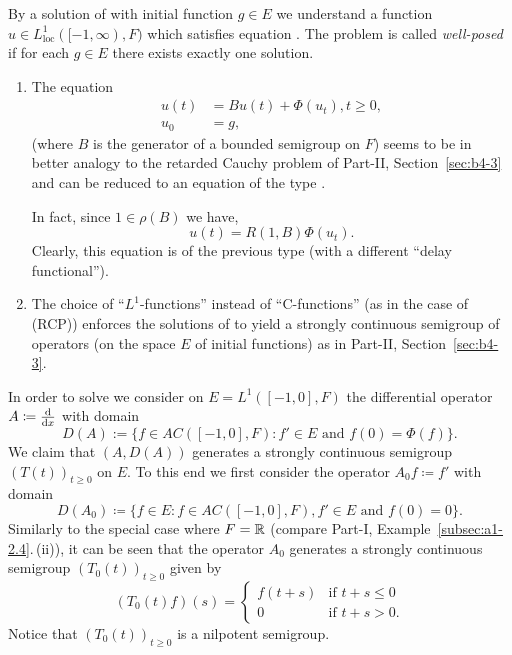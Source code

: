 By a solution of  with initial function $g \in E$ we understand a function $u \in L^{1}_{\mathrm{loc}}([-1,\infty),F)$ which satisfies equation .
The problem  is called \emph{well-posed} if for each $g \in E$ there exists exactly one solution.
\begin{remarks*}
\begin{enumerate}[\upshape (i), wide, labelindent=.25em] 
\item \label{rem:c4-kgk-1}
The equation
\begin{align*}
u(t) &= Bu(t) + \Phi(u_t), t \geq 0,\\
u_0 &= g,
\end{align*}
(where $B$ is the generator of a bounded semigroup on $F$) seems to be in better analogy to the retarded Cauchy problem of Part-II, Section~\ref{sec:b4-3} and can be reduced to an equation of the type .

In fact, since $1 \in \rho(B)$ we have,
\begin{equation*}\label{eq:c4-3.0-KGK1}
u(t) = R(1,B)\Phi(u_{t}).
\end{equation*}
Clearly, this equation is of the previous type (with a different \enquote{delay functional}).
\item \label{rem:c4-kgk-2}
The choice of \enquote{$L^{1}$-functions} instead of \enquote{C-functions} (as in the case of (RCP)) enforces the solutions of  to yield a strongly continuous semigroup of operators (on the space $E$ of initial functions) as in Part-II, Section~\ref{sec:b4-3}.
\end{enumerate}
\end{remarks*}
In order to solve  we consider on $E = L^{1}([-1,0],F)$ the differential operator $A \coloneq  \frac{\mathop{}\!\mathrm{d}{}}{\mathop{}\!\mathrm{d}{x}}$ with domain
\begin{equation*}\label{eq:c4-3.0-KGK2}
D(A):=\{f \in AC([-1,0],F) \colon f' \in E \text{ and } f(0) = \Phi(f)\}.
\end{equation*}
We claim that $(A,D(A))$ generates a strongly continuous semigroup $(T(t))_{t\geq 0}$ on $E$.
To this end we first consider the operator $A_0 f \coloneqq f'$ with domain
\begin{equation*}\label{eq:c4-3.0-KGK3}
D(A_0) \coloneqq \{f \in E \colon f \in AC([-1,0],F), f' \in E \text{ and } f(0) = 0\}.
\end{equation*}
Similarly to the special case where $F = \mathbb{R}$ (compare Part-I, Example~\ref{subsec:a1-2.4}.\,(ii)), it can be seen that the operator $A_0$ generates a strongly continuous semigroup $(T_0(t))_{t\geq 0}$ given by
\begin{equation}\label{eq:c4-3.1}
(T_0(t)f)(s) = \begin{cases}
    f(t+s) & \text{if } t+s \leq 0 \\
    0 & \text{if } t+s > 0.
\end{cases}
\end{equation}
Notice that $(T_0(t))_{t \geq 0}$ is a nilpotent semigroup.

